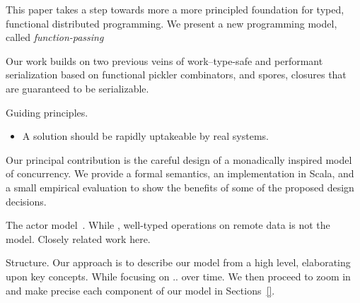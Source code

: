 \documentclass[preprint]{sigplanconf}
\theoremstyle{definition}
\theoremstyle{definition}
\begin{document}


This paper takes a step towards more a more principled foundation for typed,
functional distributed programming. We present a new programming model, called
{\em function-passing}

Our work builds on two previous veins of work--type-safe and performant
serialization based on functional pickler combinators, and spores, closures
that are guaranteed to be serializable.

Guiding principles.

\begin{itemize}[noitemsep]
\item A solution should be rapidly uptakeable by real systems.
\end{itemize}

Our principal contribution is the careful design of a monadically inspired
model of concurrency. We provide a formal semantics, an implementation in
Scala, and a small empirical evaluation to show the benefits of some of the
proposed design decisions.





The actor model~\cite{Actors, ScalaActors}. While , well-typed operations on
remote data is not the model.  Closely related work here.

Structure. Our approach is to describe our model from a high level,
elaborating upon key concepts. While focusing on .. over time. We then proceed
to zoom in and make precise each component of our model in Sections~\ref{}.
\end{document}
